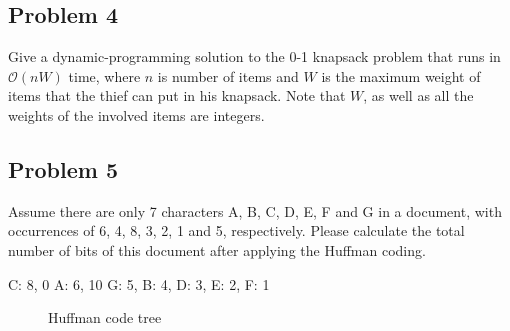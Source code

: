 \documentclass[a4paper]{article}
\makeatletter
\newenvironment{solution}
  {\begin{proof}[Solution]}
  {\end{proof}}
\renewenvironment{proof}[1][\proofname]{%
  \par\pushQED{\qed}\normalfont%
  \topsep6\p@\@plus6\p@\relax
  \trivlist\item[\hskip\labelsep\bfseries#1\@addpunct{.}]%
  \ignorespaces
}{%
  \popQED\endtrivlist\@endpefalse
}
\makeatother
\begin{document}
\begin{solution}
\end{solution}

\subsection*{Problem 4}
Give a dynamic-programming solution to the 0-1 knapsack problem that runs in $\mathcal{O}(nW)$ time, where $n$ is number of items and $W$ is the maximum weight of items that the thief can put in his knapsack. Note that $W$, as well as all the weights of the involved items are integers.
\begin{solution}
\end{solution}

\subsection*{Problem 5}
Assume there are only 7 characters A, B, C, D, E, F and G in a document, with occurrences of 6, 4, 8, 3, 2, 1 and 5, respectively. Please calculate the total number of bits of this document after applying the Huffman coding.
\begin{solution}
C: 8, 0
A: 6, 10
G: 5,
B: 4,
D: 3,
E: 2,
F: 1
\begin{figure}[H]
\centering
\begin{minipage}{5cm}
\centering
{}
\caption{Huffman code tree}
\end{minipage}
\end{figure}
\end{solution}
\end{document}

